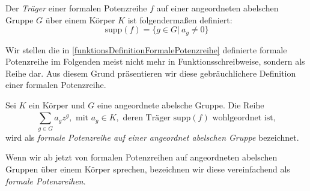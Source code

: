 \begin{defn}\label{TraegerFormalePotenzreihe}
Der \textit{Träger} einer formalen Potenzreihe $f$ auf einer angeordneten abelschen Gruppe $G$ über einem Körper $K$ ist folgendermaßen definiert: 
\[ \text{supp}(f) = \lbrace g \in G \vert ~ a_g \neq 0\rbrace\]
\end{defn}
%
%
%
Wir stellen die in \ref{funktionsDefinitionFormalePotenzreihe} definierte formale Potenzreihe im Folgenden meist nicht mehr in Funktionsschreibweise, sondern als Reihe dar. Aus diesem Grund präsentieren wir diese gebräuchlichere Definition einer formalen Potenzreihe.
\begin{defn}
Sei $K$ ein Körper und $G$ eine angeordnete abelsche Gruppe. Die Reihe 
\[\sum_{g \in G}^{}a_g z^g, \text{ mit } a_g \in K, \text{ deren Träger supp}(f) \text{ wohlgeordnet ist}, \]
wird als \textit{formale Potenzreihe auf einer angeordnet abelschen Gruppe} bezeichnet.
\end{defn}
%
%
% 
%
%
%
\begin{nota}
Wenn wir ab jetzt von formalen Potenzreihen auf angeordneten abelschen Gruppen über einem Körper sprechen, bezeichnen wir diese vereinfachend als \textit{formale Potenzreihen}.
\end{nota}
%
%
%
%
%
%
%
